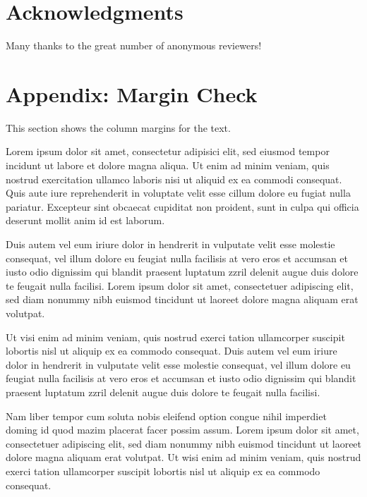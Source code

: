\documentclass[twoside,a4paper]{article}
\begin{document}
\section{Acknowledgments}
Many thanks to the great number of anonymous reviewers!

\nocite{*}




\section{Appendix: Margin Check}
This section shows the column margins for the text. \bigskip\newline

Lorem ipsum dolor sit amet, consectetur adipisici elit, sed eiusmod tempor incidunt ut labore et dolore magna aliqua. Ut enim ad minim veniam, quis nostrud exercitation ullamco laboris nisi ut aliquid ex ea commodi consequat. Quis aute iure reprehenderit in voluptate velit esse cillum dolore eu fugiat nulla pariatur. Excepteur sint obcaecat cupiditat non proident, sunt in culpa qui officia deserunt mollit anim id est laborum.


Duis autem vel eum iriure dolor in hendrerit in vulputate velit esse molestie consequat, vel illum dolore eu feugiat nulla facilisis at vero eros et accumsan et iusto odio dignissim qui blandit praesent luptatum zzril delenit augue duis dolore te feugait nulla facilisi. Lorem ipsum dolor sit amet, consectetuer adipiscing elit, sed diam nonummy nibh euismod tincidunt ut laoreet dolore magna aliquam erat volutpat.

Ut visi enim ad minim veniam, quis nostrud exerci tation ullamcorper suscipit lobortis nisl ut aliquip ex ea commodo consequat. Duis autem vel eum iriure dolor in hendrerit in vulputate velit esse molestie consequat, vel illum dolore eu feugiat nulla facilisis at vero eros et accumsan et iusto odio dignissim qui blandit praesent luptatum zzril delenit augue duis dolore te feugait nulla facilisi.

Nam liber tempor cum soluta nobis eleifend option congue nihil imperdiet doming id quod mazim placerat facer possim assum. Lorem ipsum dolor sit amet, consectetuer adipiscing elit, sed diam nonummy nibh euismod tincidunt ut laoreet dolore magna aliquam erat volutpat. Ut wisi enim ad minim veniam, quis nostrud exerci tation ullamcorper suscipit lobortis nisl ut aliquip ex ea commodo consequat.
\end{document}
